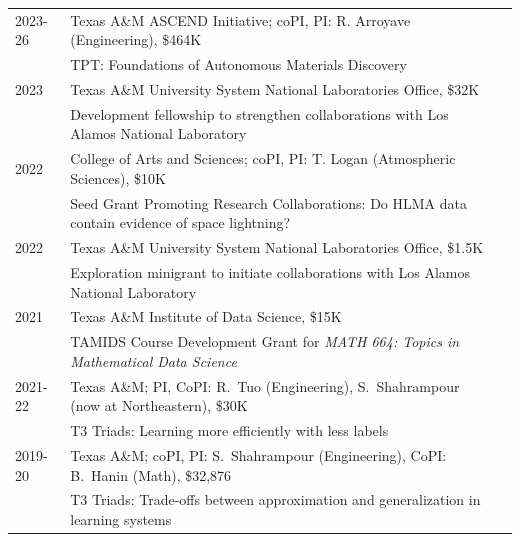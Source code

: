 \documentclass[11pt]{article}
\begin{document}
\begin{tabular}{lll}
2023-26 & Texas A\&M ASCEND Initiative; coPI, PI: R. Arroyave (Engineering), \$464K\\
& \hspace{-15mm}
{\small TPT:} Foundations of Autonomous Materials Discovery\\
2023 & Texas A\&M University System National Laboratories Office, \$32K\\
& \hspace{-15mm}
Development fellowship to strengthen collaborations with Los Alamos National Laboratory\\
2022 & College of Arts and Sciences;
coPI, PI: T. Logan (Atmospheric Sciences),  \$10K\\
& \hspace{-15mm}
{\small Seed Grant Promoting Research Collaborations:}
Do HLMA data contain evidence of space lightning?\\
2022 & Texas A\&M University System National Laboratories Office, \$1.5K\\
& \hspace{-15mm}
Exploration minigrant to initiate collaborations with Los Alamos National Laboratory\\
2021 & Texas A\&M Institute of Data Science, \$15K\\
& \hspace{-15mm}
TAMIDS Course Development Grant for {\em MATH 664: Topics in Mathematical Data Science}\\
2021-22 & Texas A\&M; PI,  CoPI: R.~Tuo (Engineering), S.~Shahrampour (now at Northeastern), \$30K\\
& \hspace{-15mm}
{\small T3 Triads:} Learning more efficiently with less labels\\
2019-20 & Texas A\&M; coPI, PI: S.~Shahrampour (Engineering), CoPI: B.~Hanin (Math), \$32,876\\
& \hspace{-15mm}
{\small T3 Triads:} Trade-offs between approximation and generalization in learning systems
\end{tabular}
\end{document}
